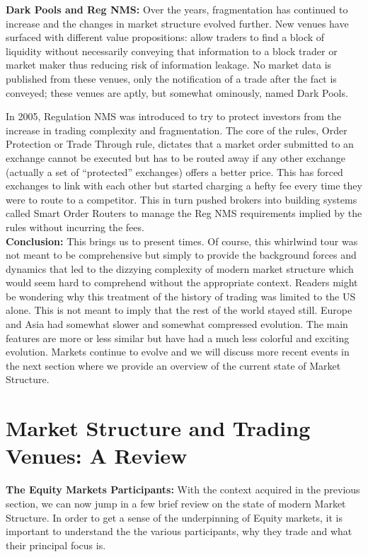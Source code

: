 \noindent\textbf{Dark Pools and Reg NMS:} Over the years, fragmentation has continued to increase and the changes in market structure evolved further. New venues have surfaced with different value propositions: allow traders to find a block of liquidity without necessarily conveying that information to a block trader or market maker thus reducing risk of information leakage. No market data is published from these venues, only the notification of a trade after the fact is conveyed; these venues are aptly, but somewhat ominously, named Dark Pools.


In 2005, Regulation NMS was introduced to try to protect investors from the increase in trading complexity and fragmentation. The core of the rules, Order Protection or Trade Through rule, dictates that a market order submitted to an exchange cannot be executed but has to be routed away if any other exchange (actually a set of ``protected'' exchanges) offers a better price. This has forced exchanges to link with each other but started charging a hefty fee every time they were to route to a competitor. This in turn pushed brokers into building systems called Smart Order Routers to manage the Reg NMS requirements implied by the rules without incurring the fees. \\


\noindent\textbf{Conclusion:} This brings us to present times. Of course, this whirlwind tour was not meant to be comprehensive but simply to provide the background forces and dynamics that led to the dizzying complexity of modern market structure which would seem hard to comprehend without the appropriate context. Readers might be wondering why this treatment of the history of trading was limited to the US alone. This is not meant to imply that the rest of the world stayed still. Europe and Asia had somewhat slower and somewhat compressed evolution. The main features are more or less similar but have had a much less colorful and exciting evolution. Markets continue to evolve and we will discuss more recent events in the next section where we provide an overview of the current state of Market Structure.



\section{Market Structure and Trading Venues: A Review}


\noindent\textbf{The Equity Markets Participants:} With the context acquired in the previous section, we can now jump in a few brief review on the state of modern Market Structure. In order to get a sense of the underpinning of Equity markets, it is important to understand the the various participants, why they trade and what their principal focus is. \\


